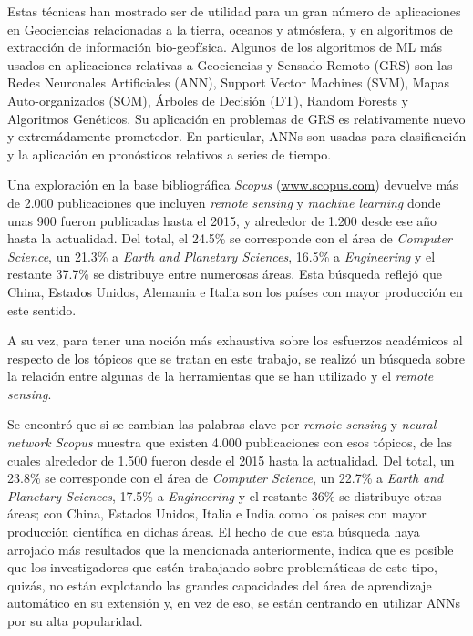    \par Estas técnicas han mostrado ser de utilidad para un gran número de
      aplicaciones en Geociencias relacionadas a la tierra, oceanos y atmósfera,
      y en algoritmos de extracción de información bio-geofísica.
      Algunos de los algoritmos de ML más usados en aplicaciones relativas a
      Geociencias y Sensado Remoto (GRS) son las Redes Neuronales Artificiales (ANN),
      Support Vector Machines (SVM), Mapas Auto-organizados (SOM), Árboles de Decisión (DT),
      Random Forests y Algoritmos Genéticos. Su aplicación en problemas de GRS es
      relativamente nuevo y extremádamente prometedor. En particular, ANNs son
      usadas para clasificación y la aplicación en pronósticos
      relativos a series de tiempo.

    \par Una exploración en la base bibliográfica \textit{Scopus} (\url{www.scopus.com})
      devuelve más de 2.000 publicaciones que incluyen \textit{remote sensing} y
      \textit{machine learning} donde unas 900 fueron publicadas hasta el 2015, y
      alrededor de 1.200 desde ese año hasta la actualidad. Del total, el 24.5\% se
      corresponde con el área de \textit{Computer Science}, un 21.3\% a
      \textit{Earth and Planetary Sciences}, 16.5\% a \textit{Engineering} y el
      restante 37.7\% se distribuye entre numerosas áreas. Esta búsqueda reflejó
      que China, Estados Unidos, Alemania e Italia son los países con mayor
      producción en este sentido.

    \par A su vez, para tener una noción más exhaustiva sobre los esfuerzos académicos
      al respecto de los tópicos que se tratan en este trabajo, se realizó un búsqueda
      sobre la relación entre algunas de la herramientas que se han utilizado y
      el \textit{remote sensing}.

    \par Se encontró que si se cambian las palabras clave por
      \textit{remote sensing} y \textit{neural network} \textit{Scopus} muestra
      que existen 4.000 publicaciones con esos tópicos, de las cuales alrededor de
      1.500 fueron desde el 2015 hasta la actualidad. Del total, un 23.8\% se
      corresponde con el área de \textit{Computer Science}, un 22.7\% a
      \textit{Earth and Planetary Sciences}, 17.5\% a \textit{Engineering} y el
      restante 36\% se distribuye otras áreas; con China,
      Estados Unidos, Italia e India como los paises con mayor producción
      científica en dichas áreas.
      El hecho de que esta búsqueda haya arrojado más resultados que la mencionada
      anteriormente, indica que es posible que los investigadores que estén trabajando
      sobre problemáticas de este tipo, quizás, no están explotando las grandes
      capacidades del área de aprendizaje automático en su extensión y, en vez de
      eso, se están centrando en utilizar ANNs por su alta popularidad.

